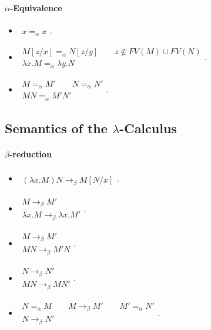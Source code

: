 \documentclass[twocolumn,english]{article}
\begin{document}
\paragraph{$\alpha$-Equivalence}
\begin{itemize}
\item $\begin{array}{c}
\\
\hline x=_{\alpha}x
\end{array}$.
\item $\begin{array}{c}
M\left[z/x\right]=_{\alpha}N\left[z/y\right]\qquad z\notin FV\left(M\right)\cup FV\left(N\right)\\
\hline \lambda x.M=_{\alpha}\lambda y.N
\end{array}$.
\item $\begin{array}{c}
M=_{\alpha}M'\qquad N=_{\alpha}N'\\
\hline MN=_{\alpha}M'N'
\end{array}$.
\end{itemize}

\subsection{Semantics of the $\lambda$-Calculus}

\paragraph{$\beta$-reduction}
\begin{itemize}
\item $\begin{array}{c}
\\
\hline \left(\lambda x.M\right)N\rightarrow_{\beta}M\left[N/x\right]
\end{array}$.
\item $\begin{array}{c}
M\rightarrow_{\beta}M'\\
\hline \lambda x.M\rightarrow_{\beta}\lambda x.M'
\end{array}$.
\item $\begin{array}{c}
M\rightarrow_{\beta}M'\\
\hline MN\rightarrow_{\beta}M'N
\end{array}$.
\item $\begin{array}{c}
N\rightarrow_{\beta}N'\\
\hline MN\rightarrow_{\beta}MN'
\end{array}$.
\item $\begin{array}{c}
N=_{\alpha}M\qquad M\rightarrow_{\beta}M'\qquad M'=_{\alpha}N'\\
\hline N\rightarrow_{\beta}N'
\end{array}$.
\end{itemize}
\end{document}
